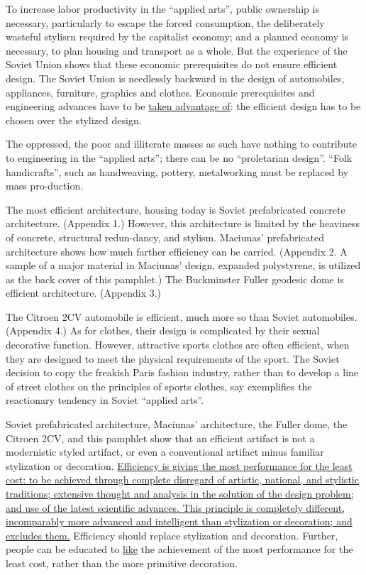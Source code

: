 To increase labor productivity in the \enquote{applied arts}, public
ownership is necessary, particularly to escape the forced consumption,
the deliberately wasteful stylisrn required by the capitalist economy;
and a planned economy is necessary, to plan housing and transport as a
whole. But the experience of the Soviet Union shows that these economic
prerequisites do not ensure efficient design. The Soviet Union is 
needlessly backward in the design of automobiles, appliances, furniture,
graphics and clothes. Economic prerequisites and engineering advances
have to be \uline{taken advantage of}: the efficient design has to be chosen 
over the stylized design. 

The oppressed, the poor and illiterate masses as such have nothing to 
contribute to engineering in the \enquote{applied arts}; there can be no 
\enquote{proletarian design}. \enquote{Folk handicrafts}, such as handweaving, pottery,
metalworking must be replaced by mass pro-duction. 

The most efficient architecture, housing today is Soviet prefabricated
concrete architecture. (Appendix 1.) However, this architecture is 
limited by the heaviness of concrete, structural redun-dancy, and 
stylism. Maciunas' prefabricated architecture shows how much farther 
efficiency can be carried. (Appendix 2. A sample of a major material 
in Maciunas' design, expanded polystyrene, is utilized as the back 
cover of this pamphlet.) The Buckminster Fuller geodesic dome is efficient
architecture. (Appendix 3.) 

The Citroen 2CV automobile is efficient, much more so than Soviet 
automobiles. (Appendix 4.) As for clothes, their design is complicated by
their sexual decorative function. However, attractive sports clothes are
often efficient, when they are designed to meet the physical requirements of
the sport. The Soviet decision to copy the freakish Paris fashion industry,
rather than to develop a line of street clothes on the principles of sports
clothes, say exemplifies the reactionary tendency in Soviet \enquote{applied arts}. 

Soviet prefabricated architecture, Maciunas' architecture, the Fuller 
dome, the Citroen 2CV, and this pamphlet show that an efficient artifact
is not a modernistic styled artifact, or even a conventional artifact minus
familiar stylization or decoration. \uline{Efficiency is giving the most performance
for the least cost: to be achieved through complete disregard of 
artistic, national, and stylistic traditions; extensive thought and analysis
in the solution of the design problem; and use of the latest scientific advances.
This principle is completely different, incomparably more advanced and 
intelligent than stylization or decoration; and excludes them.} Efficiency
should replace stylization and decoration. Further, people can be educated to
\uline{like} the achievement of the most performance for the least cost, rather than the more
primitive decoration. 

